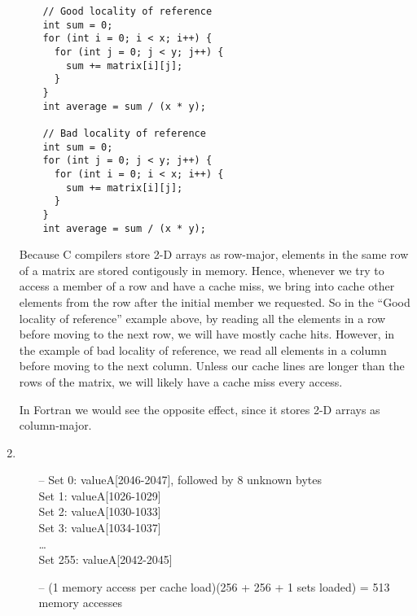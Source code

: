 \documentclass{article}
\begin{document}
\begin{enumerate}
\begin{verbatim}
    // Good locality of reference
    int sum = 0;
    for (int i = 0; i < x; i++) {
      for (int j = 0; j < y; j++) {
        sum += matrix[i][j];
      }
    }
    int average = sum / (x * y);

    // Bad locality of reference
    int sum = 0;
    for (int j = 0; j < y; j++) {
      for (int i = 0; i < x; i++) {
        sum += matrix[i][j];
      }
    }
    int average = sum / (x * y);
    \end{verbatim}
    Because C compilers store 2-D arrays as row-major, elements in the same row
    of a matrix are stored contigously in memory. Hence, whenever we try to access
    a member of a row and have a cache miss, we bring into cache other elements from the row after the
    initial member we requested. So in the ``Good locality of reference'' example above,
    by reading all the elements in a row before moving to the next row, we will have mostly cache hits.
    However, in the example of bad locality of reference, we read all elements in a column before moving
    to the next column. Unless our cache lines are longer than the rows of the matrix, we will likely
    have a cache miss every access.

    In Fortran we would see the opposite effect, since it stores 2-D arrays as column-major.

    \item
      \begin{itemize}
        \item[--]
          Set 0: valueA[2046-2047], followed by 8 unknown bytes \\
          Set 1: valueA[1026-1029] \\
          Set 2: valueA[1030-1033] \\
          Set 3: valueA[1034-1037] \\
          \ldots \\
          Set 255: valueA[2042-2045]
        \item[--]
          (1 memory access per cache load)(256 + 256 + 1 sets loaded) = 513 memory accesses
      \end{itemize}

  \end{enumerate}
  
  
\end{document}
